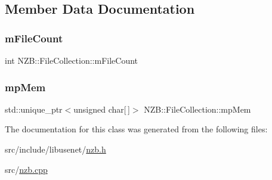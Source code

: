 \subsection{Member Data Documentation}
\hypertarget{class_n_z_b_1_1_file_collection_a54a530b2c5e4e487d588eee98e403cbe}{}\label{class_n_z_b_1_1_file_collection_a54a530b2c5e4e487d588eee98e403cbe} 
\subsubsection{\texorpdfstring{m\+File\+Count}{mFileCount}}
{\footnotesize\ttfamily int N\+Z\+B\+::\+File\+Collection\+::m\+File\+Count\hspace{0.3cm}{\ttfamily [protected]}}

\hypertarget{class_n_z_b_1_1_file_collection_aee454b60ab12185c5328e950d5b1d444}{}\label{class_n_z_b_1_1_file_collection_aee454b60ab12185c5328e950d5b1d444} 
\subsubsection{\texorpdfstring{mp\+Mem}{mpMem}}
{\footnotesize\ttfamily std\+::unique\+\_\+ptr$<$unsigned char\mbox{[}$\,$\mbox{]}$>$ N\+Z\+B\+::\+File\+Collection\+::mp\+Mem\hspace{0.3cm}{\ttfamily [protected]}}



The documentation for this class was generated from the following files\+:\begin{DoxyCompactItemize}
\item 
src/include/libusenet/\hyperlink{nzb_8h}{nzb.\+h}\item 
src/\hyperlink{nzb_8cpp}{nzb.\+cpp}\end{DoxyCompactItemize}

